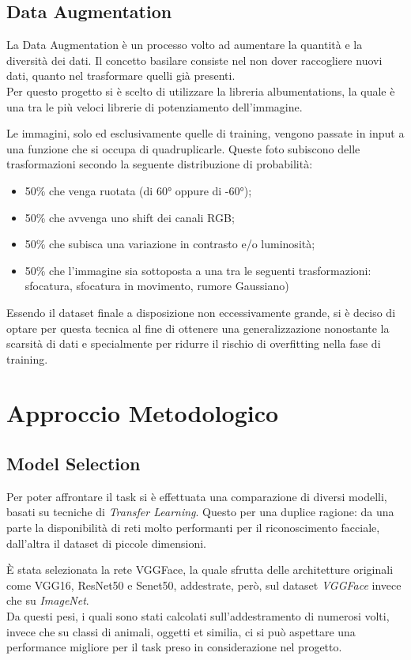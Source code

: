 \subsection{Data Augmentation}

La Data Augmentation è un processo volto ad aumentare la quantità e la diversità dei dati. Il concetto basilare consiste nel non dover raccogliere nuovi dati, quanto nel trasformare quelli già presenti.\\
Per questo progetto si è scelto di utilizzare la libreria albumentations, la quale è una tra le più veloci librerie di potenziamento dell'immagine.

Le immagini, solo ed esclusivamente quelle di training, vengono passate in input a una funzione che si occupa di quadruplicarle. Queste foto subiscono delle trasformazioni secondo la seguente distribuzione di probabilità:
\begin{itemize}
\item50\% che venga ruotata (di 60° oppure di -60°);
\item50\% che avvenga uno shift dei canali RGB;
\item50\% che subisca una variazione in contrasto e/o luminosità;
\item50\% che l'immagine sia sottoposta a una tra le seguenti trasformazioni: sfocatura, sfocatura in movimento, rumore Gaussiano)
\end{itemize}

Essendo il dataset finale a disposizione non eccessivamente grande, si è deciso di optare per questa tecnica al fine di ottenere una generalizzazione nonostante la scarsità di dati e specialmente per ridurre il rischio di overfitting nella fase di training.

\section{Approccio Metodologico}

\subsection{Model Selection}
Per poter affrontare il task si è effettuata una comparazione di diversi modelli, basati su tecniche di \textit{Transfer Learning}. Questo per una duplice ragione: da una parte la disponibilità di reti molto performanti per il riconoscimento facciale, dall'altra il dataset di piccole dimensioni.

È stata selezionata la rete VGGFace, la quale sfrutta delle architetture originali come VGG16, ResNet50 e Senet50, addestrate, però, sul dataset \textit{VGGFace} \cite{article5} invece che su \textit{ImageNet}.\\
Da questi pesi, i quali sono stati calcolati sull'addestramento di numerosi volti, invece che su classi di animali, oggetti et similia, ci si può aspettare una performance migliore per il task preso in considerazione nel progetto.

